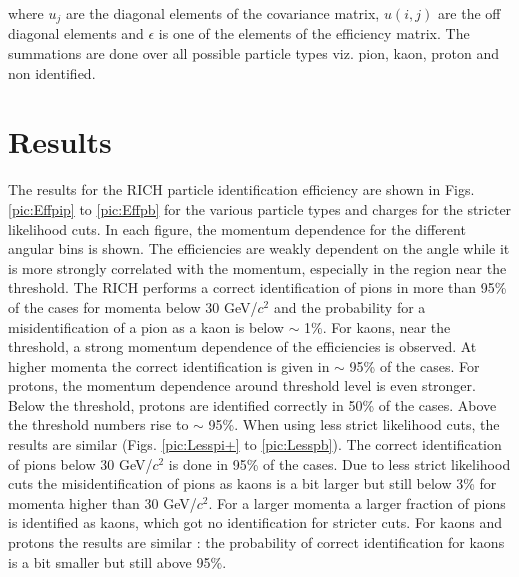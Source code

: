where $u_j$ are the diagonal elements of the covariance matrix, $u(i,j)$ are the off diagonal elements and $\epsilon$ is one of the elements of the efficiency matrix. The summations are done over all possible particle types viz. pion, kaon, proton and non identified.

\section{Results}

The results for the RICH particle identification efficiency are shown in Figs. \ref{pic:Effpip} to \ref{pic:Effpb} for the various particle types and charges for the stricter likelihood cuts. In each figure, the momentum dependence for the different angular bins is shown. The efficiencies are weakly dependent on the angle while it is more strongly correlated with the momentum, especially in the region near the threshold.
The RICH performs a correct identification of pions in more than 95\% of the cases for momenta below 30 GeV/$c^2$ and the probability for a misidentification of a pion as a kaon is below $\sim$ 1\%. For kaons, near the threshold, a strong momentum dependence of the efficiencies is observed. At higher momenta the correct identification is given in $\sim$ 95\% of the cases. For protons, the momentum dependence around threshold level is even stronger. Below the threshold, protons are identified correctly in 50\% of the cases. Above the threshold numbers rise to $\sim$ 95\%. When using less strict likelihood cuts, the results are similar (Figs. \ref{pic:Lesspi+} to \ref{pic:Lesspb}). The correct identification of pions below 30 GeV/$c^2$ is done in 95\% of the cases. Due to less strict likelihood cuts the misidentification of pions as kaons is a bit larger but still below 3\% for momenta higher than 30 GeV/$c^2$. For a larger momenta a larger fraction of pions is identified as kaons, which got no identification for stricter cuts. For kaons and protons the results are similar : the probability of correct identification for kaons is a bit smaller but still above 95\%.

